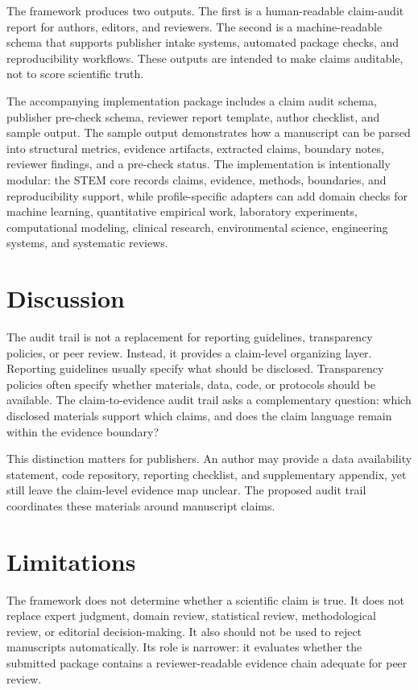 \documentclass[12pt]{article}
\begin{document}
The framework produces two outputs. The first is a human-readable claim-audit report for authors, editors, and reviewers. The second is a machine-readable schema that supports publisher intake systems, automated package checks, and reproducibility workflows. These outputs are intended to make claims auditable, not to score scientific truth.

The accompanying implementation package includes a claim audit schema, publisher pre-check schema, reviewer report template, author checklist, and sample output. The sample output demonstrates how a manuscript can be parsed into structural metrics, evidence artifacts, extracted claims, boundary notes, reviewer findings, and a pre-check status. The implementation is intentionally modular: the STEM core records claims, evidence, methods, boundaries, and reproducibility support, while profile-specific adapters can add domain checks for machine learning, quantitative empirical work, laboratory experiments, computational modeling, clinical research, environmental science, engineering systems, and systematic reviews.

\section{Discussion}

The audit trail is not a replacement for reporting guidelines, transparency policies, or peer review. Instead, it provides a claim-level organizing layer. Reporting guidelines usually specify what should be disclosed. Transparency policies often specify whether materials, data, code, or protocols should be available. The claim-to-evidence audit trail asks a complementary question: which disclosed materials support which claims, and does the claim language remain within the evidence boundary?

This distinction matters for publishers. An author may provide a data availability statement, code repository, reporting checklist, and supplementary appendix, yet still leave the claim-level evidence map unclear. The proposed audit trail coordinates these materials around manuscript claims.

\section{Limitations}

The framework does not determine whether a scientific claim is true. It does not replace expert judgment, domain review, statistical review, methodological review, or editorial decision-making. It also should not be used to reject manuscripts automatically. Its role is narrower: it evaluates whether the submitted package contains a reviewer-readable evidence chain adequate for peer review.
\end{document}
